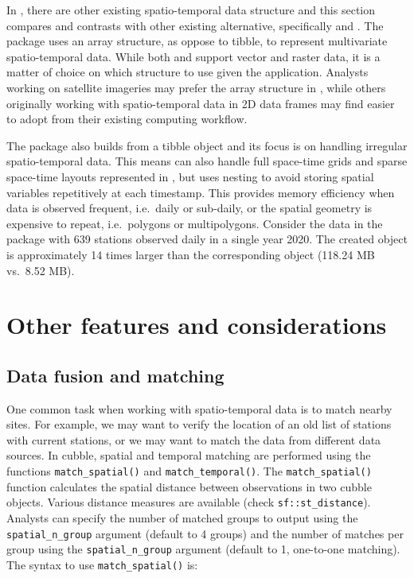 \documentclass[
]{jss}
\begin{document}
In , there are other existing spatio-temporal data structure
and this section compares and contrasts  with other existing
alternative, specifically  and . The 
package \citep{stars} uses an array structure, as oppose to tibble, to
represent multivariate spatio-temporal data. While both  and
 support vector and raster data, it is a matter of choice on
which structure to use given the application. Analysts working on
satellite imageries may prefer the array structure in , while
others originally working with spatio-temporal data in 2D data frames
may find  easier to adopt from their existing computing
workflow.

The  package \citep{sftime} also builds from a tibble object
and its focus is on handling irregular spatio-temporal data. This means
 can also handle full space-time grids and sparse space-time
layouts represented in , but  uses nesting to
avoid storing spatial variables repetitively at each timestamp. This
provides memory efficiency when data is observed frequent, i.e.~daily or
sub-daily, or the spatial geometry is expensive to repeat, i.e.~polygons
or multipolygons. Consider the  data in the
 package with 639 stations observed daily in a single year
2020. The created  object is approximately 14 times larger
than the corresponding  object (118.24 MB vs.~8.52 MB).

\hypertarget{others}{%
\section{Other features and considerations}\label{others}}

\hypertarget{matching}{%
\subsection{Data fusion and matching}\label{matching}}

One common task when working with spatio-temporal data is to match
nearby sites. For example, we may want to verify the location of an old
list of stations with current stations, or we may want to match the data
from different data sources. In cubble, spatial and temporal matching
are performed using the functions \texttt{match\_spatial()} and
\texttt{match\_temporal()}. The \texttt{match\_spatial()} function
calculates the spatial distance between observations in two cubble
objects. Various distance measures are available (check
\texttt{sf::st\_distance}). Analysts can specify the number of matched
groups to output using the \texttt{spatial\_n\_group} argument (default
to 4 groups) and the number of matches per group using the
\texttt{spatial\_n\_group} argument (default to 1, one-to-one matching).
The syntax to use \texttt{match\_spatial()} is:
\end{document}
